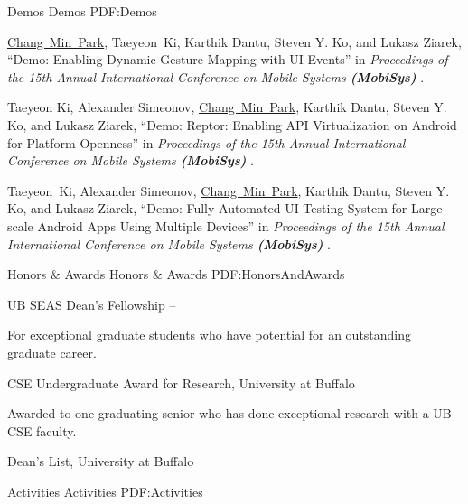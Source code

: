 \documentclass[letterpaper,MMMyyyy,nonstopmode]{simpleresumecv}
\begin{document}
\begin{Body}
\BigGap
\SubSection
{Demos}
{Demos}
{PDF:Demos}

\begingroup
\renewcommand{\MaxNumberedItem}{[88]}

\BigGap
\NumberedItem{[1]}
\underline{Chang~Min~Park}, Taeyeon~Ki, Karthik Dantu, Steven Y. Ko, and Lukasz Ziarek, 
``Demo: Enabling Dynamic Gesture Mapping with UI Events'' in
\textit{Proceedings of the 15th Annual International Conference on Mobile Systems \textbf{(MobiSys)}
}.

\Gap
\NumberedItem{[2]}
Taeyeon Ki, Alexander Simeonov, \underline{Chang~Min~Park}, Karthik Dantu, Steven Y. Ko, 
and Lukasz Ziarek, 
``Demo: Reptor: Enabling API Virtualization on Android for Platform Openness'' in
\textit{Proceedings of the 15th Annual International Conference on Mobile Systems \textbf{(MobiSys)}
}.

\Gap
\NumberedItem{[3]}
Taeyeon~Ki, Alexander Simeonov, \underline{Chang~Min~Park}, Karthik Dantu, 
Steven Y. Ko, and Lukasz Ziarek, 
``Demo: Fully Automated UI Testing System for Large-scale Android Apps Using Multiple 
Devices'' in
\textit{Proceedings of the 15th Annual International Conference on Mobile Systems \textbf{(MobiSys)}
}.




\Section
{Honors \&\newline
Awards}
{Honors \& Awards}
{PDF:HonorsAndAwards}


\BulletItem
UB SEAS Dean’s Fellowship
\hfill
{} --
\begin{Detail}
\Item
For exceptional graduate students who have potential for an outstanding 
graduate career. 
\end{Detail}

\Gap
\BulletItem
CSE Undergraduate Award for Research, University at Buffalo
\hfill
{}
\begin{Detail}
\Item
Awarded to one graduating senior who has done exceptional research with a UB CSE faculty. 
\end{Detail}

\Gap
\BulletItem
Dean's List, University at Buffalo
\hfill
{}



\Section
{Activities}
{Activities}
{PDF:Activities}


\end{Body}
\end{document}
